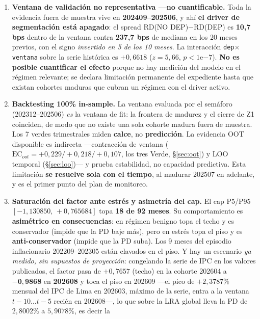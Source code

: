 \documentclass[12pt, a4paper]{article}
\newcommand{\RD}{\ensuremath{\mathrm{RD}}}
\newcommand{\EC}{\ensuremath{\mathrm{EC}}}
\begin{document}
\begin{enumerate}[nosep]
  \item \textbf{Ventana de validación no representativa ---no cuantificable.} Toda la evidencia
    fuera de muestra vive en \textbf{202409--202506}, y ahí \textbf{el driver de segmentación está
    apagado}: el spread $\RD$(NO DEP)$-\RD$(DEP) es \textbf{10,7 bps} dentro de la ventana contra
    \textbf{237,7 bps} de mediana en los 20 meses previos, con el signo \emph{invertido en 5 de los
    10 meses}. La interacción \texttt{dep}$\times$\texttt{ventana} sobre la serie histórica es
    $+0{,}6618$ ($z=5{,}66$, $p<1$e$-7$). \textbf{No es posible cuantificar el efecto} porque no hay
    medición del modelo en el régimen relevante; se declara limitación permanente del expediente
    hasta que existan cohortes maduras que cubran un régimen con el driver activo.
  \item \textbf{Backtesting 100\% in-sample.} La ventana evaluada por el semáforo (202312--202506)
    \emph{es} la ventana de fit: la frontera de madurez y el cierre de Z1 coinciden, de modo que no
    existe una sola cohorte madura fuera de muestra. Los 7 verdes trimestrales miden \textbf{calce},
    no \textbf{predicción}. La evidencia OOT disponible es indirecta ---contracción de ventana
    ($\EC_{oot}=+0{,}229/+0{,}218/+0{,}107$, los tres Verde, \S\ref{sec:oot}) y LOO temporal
    (\S\ref{sec:loo})--- y prueba estabilidad, no capacidad predictiva. Esta limitación
    \textbf{se resuelve sola con el tiempo}, al madurar 202507 en adelante, y es el primer punto del
    plan de monitoreo.
  \item \textbf{Saturación del factor ante estrés y asimetría del cap.} El cap P5/P95
    $[-1{,}130850,\,+0{,}765684]$ topa \textbf{18 de 92 meses}. Su comportamiento es
    \textbf{asimétrico en consecuencias}: en régimen benigno topa el techo y es conservador (impide
    que la PD baje más), pero en estrés topa el piso y es \textbf{anti-conservador} (impide que la
    PD suba). Los 9 meses del episodio inflacionario 202209--202305 están clavados en el piso. Y hay un escenario
    \emph{ya medido, sin supuestos de proyección}: congelando la serie de IPC en los valores
    publicados, el factor pasa de $+0{,}7657$ (techo) en la cohorte 202604 a $\mathbf{-0{,}9868}$ en
    \textbf{202608} y toca el piso en 202609 ---el pico de $+2{,}3787\%$ mensual del IPC de Lima en
    202603, máximo de la serie, entra a la ventana $t-10\ldots t-5$ recién en 202608---, lo que
    sobre la LRA global lleva la PD de $2{,}8002\%$ a $5{,}9078\%$, es decir la

\end{enumerate}
\end{document}
